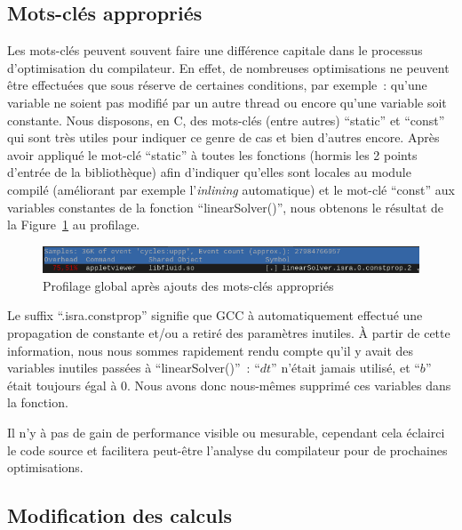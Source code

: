\documentclass[12pt,a4paper]{article}
\begin{document}
\subsection{Mots-clés appropriés}
\label{sub.optim.keywords}

Les mots-clés peuvent souvent faire une différence capitale dans le processus
d’optimisation du compilateur. En effet, de nombreuses optimisations ne peuvent
être effectuées que sous réserve de certaines conditions, par exemple : qu’une
variable ne soient pas modifié par un autre thread ou encore qu’une variable
soit constante. Nous disposons, en C, des mots-clés (entre autres)
\enquote{static} et \enquote{const} qui sont très utiles pour indiquer ce genre
de cas et bien d’autres encore. Après avoir appliqué le mot-clé \enquote{static}
à toutes les fonctions (hormis les 2 points d’entrée de la bibliothèque) afin
d’indiquer qu’elles sont locales au module compilé (améliorant par exemple
l’\textit{inlining} automatique) et le mot-clé \enquote{const} aux variables
constantes de la fonction \enquote{linearSolver()}, nous obtenons le résultat de
la Figure~\ref{fig.optim.keywords.global} au profilage.

\begin{figure}
    \centering
    \includegraphics[scale=0.55]{figures/optims/keywords/global.png}
    \caption{Profilage global après ajouts des mots-clés appropriés}
    \label{fig.optim.keywords.global}
\end{figure}

Le suffix \enquote{.isra.constprop} signifie que \ac{GCC} à automatiquement
effectué une propagation de constante et/ou a retiré des paramètres inutiles. À
partir de cette information, nous nous sommes rapidement rendu compte qu’il y
avait des variables inutiles passées à \enquote{linearSolver()} : \enquote{$dt$}
n’était jamais utilisé, et \enquote{$b$} était toujours égal à 0. Nous avons
donc nous-mêmes supprimé ces variables dans la fonction.

Il n’y à pas de gain de performance visible ou mesurable, cependant cela
éclairci le code source et facilitera peut-être l’analyse du compilateur pour de
prochaines optimisations. 

\subsection{Modification des calculs}
\label{sub.optim.cacl}
\end{document}
